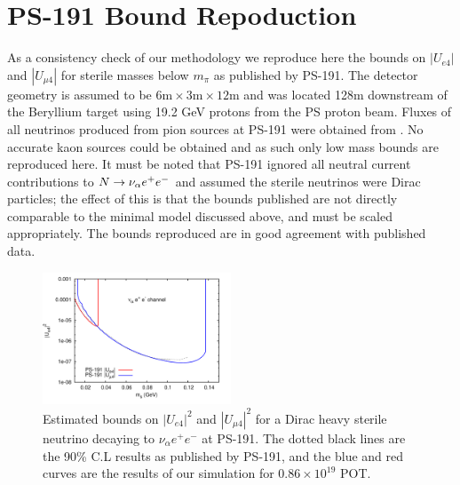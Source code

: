 \documentclass[11pt, a4paper]{article}
\def\ster{\ensuremath N}
\begin{document}
\section{PS-191 Bound Repoduction\label{sec:ps191}}

As a consistency check of our methodology we reproduce here the bounds on
$|U_{e4}|$ and $|U_{\mu 4}|$ for sterile masses below $m_\pi$ as published by
PS-191. The detector geometry is assumed to be $6\text{m} \times 3\text{m}
\times 12 \text{m}$ and was located 128m downstream of the Beryllium target
using 19.2 GeV protons from the PS proton beam.  Fluxes of all neutrinos
produced from pion sources at PS-191 were obtained from \cite{ps191THesis}. No
accurate kaon sources could be obtained and as such only low mass bounds are
reproduced here. It must be noted that PS-191 ignored all neutral current
contributions to $\ster \rightarrow \nu_\alpha e^+ e^-$ and assumed the sterile
neutrinos were Dirac particles; the effect of this is that the bounds published
are not directly comparable to the minimal model discussed above, and must be
scaled appropriately. The bounds reproduced are in good agreement with published
data.

\begin{figure}
			  \centering
			 
\includegraphics[width=0.5\textwidth]{figures/PS-191_test.pdf}

\caption{\label{fig:ps191test} Estimated bounds on $|U_{e4}|^2$ and $|U_{\mu
4}|^2$ for a Dirac heavy sterile neutrino decaying to $\nu_\alpha e^+ e^-$ at
PS-191. The dotted black lines are the 90\% C.L results as published by PS-191,
and the blue and red curves are the results of our simulation for $0.86 \times
10^{19}$ POT.}

\end{figure}
\end{document}
